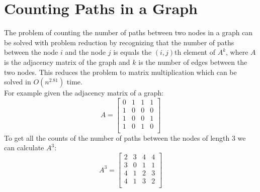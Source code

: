 \documentclass[12pt letter]{report}
\begin{document}
\section{Counting Paths in a Graph}
The problem of counting the number of paths between two nodes in a graph can be solved with problem reduction by
recognizing that the number of paths between the node $i$ and the node $j$ is equals the $ \left( i, j \right) $th
element of $A^{k}$, where $A$ is the adjacency matrix of the graph and $k$ is the number of edges between the two nodes.
This reduces the problem to matrix multiplication which can be solved in $O(n^2.81)$  time.
\\
For example given the adjacency matrix of a graph:
\[
  A = \begin{bmatrix}
    0 & 1 & 1 & 1 \\
    1 & 0 & 0 & 0 \\
    1 & 0 & 0 & 1 \\
    1 & 0 & 1 & 0 \\
  \end{bmatrix}
\]
To get all the counts of the number of paths between the nodes of length $3$ we can calculate $A^{3}$:
\[
  A^{3} = \begin{bmatrix}
    2 & 3 & 4 & 4 \\
    3 & 0 & 1 & 1 \\
    4 & 1 & 2 & 3 \\
    4 & 1 & 3 & 2 \\
  \end{bmatrix}
\]
\end{document}
